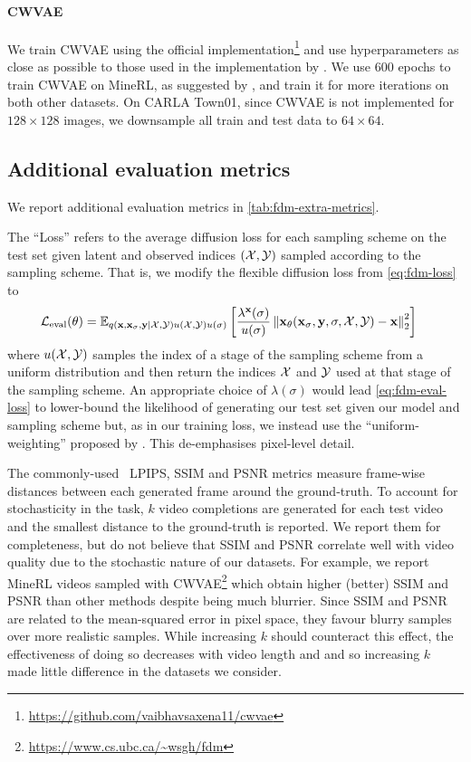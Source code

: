 \paragraph{CWVAE}
We train CWVAE using the official implementation\footnote{\url{https://github.com/vaibhavsaxena11/cwvae}} and use hyperparameters as close as possible to those used in the implementation by \citet{saxena2021clockwork}. We use 600 epochs to train CWVAE on MineRL, as suggested by \citet{saxena2021clockwork}, and train it for more iterations on both other datasets. On CARLA Town01, since CWVAE is not implemented for $128\times128$ images, we downsample all train and test data to $64\times64$.

\subsection{Additional evaluation metrics}
We report additional evaluation metrics in \cref{tab:fdm-extra-metrics}. 

The ``Loss'' refers to the average diffusion loss for each sampling scheme on the test set given latent and observed indices $({\mathcal{X}}, {\mathcal{Y}})$ sampled according to the sampling scheme. That is, we modify the flexible diffusion loss from \cref{eq:fdm-loss} to
\begin{align} \label{eq:fdm-eval-loss}
    \mathcal{L}_\text{eval}(\theta) &= \mathbb{E}_{q({\mathbf{x}}, {\mathbf{x}}_\sigma, {\mathbf{y}}|{\mathcal{X}}, {\mathcal{Y}})u({\mathcal{X}}, {\mathcal{Y}})u(\sigma)} \left[ \frac{\lambda^{\mathbf{x}}(\sigma)}{u(\sigma)} 
    \left\| {\mathbf{x}}_\theta({\mathbf{x}}_\sigma, {\mathbf{y}}, \sigma, {\mathcal{X}}, {\mathcal{Y}}) - {\mathbf{x}} \right\|_2^2 \right]
\end{align}
where $u({\mathcal{X}}, {\mathcal{Y}})$ samples the index of a stage of the sampling scheme from a uniform distribution and then return the indices ${\mathcal{X}}$ and ${\mathcal{Y}}$ used at that stage of the sampling scheme. An appropriate choice of $\lambda(\sigma)$ would lead \cref{eq:fdm-eval-loss} to lower-bound the likelihood of generating our test set given our model and sampling scheme but, as in our training loss, we instead use the ``uniform-weighting'' proposed by \citet{ho2020denoising}. This de-emphasises pixel-level detail. 

The commonly-used~\citep{saxena2021clockwork,babaeizadeh2021fitvid} LPIPS, SSIM and PSNR metrics measure frame-wise distances between each generated frame around the ground-truth. To account for stochasticity in the task, $k$ video completions are generated for each test video and the smallest distance to the ground-truth is reported. We report them for completeness, but do not believe that SSIM and PSNR correlate well with video quality due to the stochastic nature of our datasets. For example, we report MineRL videos sampled with CWVAE\footnote{\url{https://www.cs.ubc.ca/~wsgh/fdm}} which obtain higher (better) SSIM and PSNR than other methods despite being much blurrier. Since SSIM and PSNR are related to the mean-squared error in pixel space, they favour blurry samples over more realistic samples. While increasing $k$ should counteract this effect, the effectiveness of doing so decreases with video length and and so increasing $k$ made little difference in the datasets we consider.


